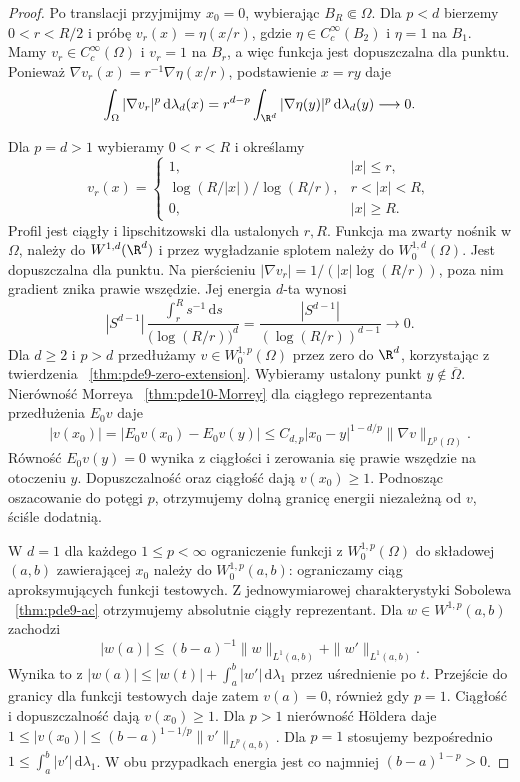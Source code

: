 \begin{proof}
Po translacji przyjmijmy $x_0=0$, wybierając
$B_R\Subset\Omega$. Dla $p<d$ bierzemy
$0<r<R/2$ i próbę $v_r(x)=\eta(x/r)$, gdzie
$\eta\in C_c^\infty(B_2)$ i $\eta=1$ na $B_1$.
Mamy $v_r\in C_c^\infty(\Omega)$ i $v_r=1$ na $B_r$,
a więc funkcja jest dopuszczalna dla punktu.
Ponieważ $\nabla v_r(x)=r^{-1}\nabla\eta(x/r)$,
podstawienie $x=ry$ daje
\[
 \int_\Omega|\nabla v_r|^p\,\mathrm d\lambda_d(x)
 =r^{d-p}\int_{\R^d}|\nabla\eta(y)|^p\,\mathrm d\lambda_d(y)
 \longrightarrow0.
\]

Dla $p=d>1$ wybieramy $0<r<R$ i określamy
\[
 v_r(x)=
 \begin{cases}
 1,& |x|\le r,\\
 \log(R/|x|)/\log(R/r),&r<|x|<R,\\
 0,&|x|\ge R.
 \end{cases}
\]
Profil jest ciągły i lipschitzowski dla ustalonych $r,R$.
Funkcja ma zwarty nośnik w $\Omega$, należy do
$W^{1,d}(\R^d)$ i przez wygładzanie splotem należy
do $W_0^{1,d}(\Omega)$. Jest dopuszczalna dla punktu.
Na pierścieniu $|\nabla v_r|=1/(|x|\log(R/r))$,
poza nim gradient znika prawie wszędzie.
Jej energia $d$-ta wynosi
\[
 |S^{d-1}|\,\frac{\displaystyle\int_r^R s^{-1}\,\mathrm ds}
 {\bigl(\log(R/r)\bigr)^d}
 =\frac{|S^{d-1}|}{(\log(R/r))^{d-1}}\longrightarrow0.
\]
Dla $d\ge2$ i $p>d$ przedłużamy $v\in W_0^{1,p}(\Omega)$
przez zero do $\R^d$, korzystając z twierdzenia
~\ref{thm:pde9-zero-extension}. Wybieramy ustalony
punkt $y\notin\overline\Omega$. Nierówność Morreya
~\ref{thm:pde10-Morrey} dla ciągłego reprezentanta
przedłużenia $E_0v$ daje
\[
 |v(x_0)|=|E_0v(x_0)-E_0v(y)|
 \le C_{d,p}|x_0-y|^{1-d/p}\|\nabla v\|_{L^p(\Omega)}.
\]
Równość $E_0v(y)=0$ wynika z ciągłości i zerowania się
prawie wszędzie na otoczeniu $y$.
Dopuszczalność oraz ciągłość dają $v(x_0)\ge1$.
Podnosząc oszacowanie do potęgi $p$, otrzymujemy
dolną granicę energii niezależną od $v$, ściśle dodatnią.

W $d=1$ dla każdego $1\le p<\infty$ ograniczenie
funkcji z $W_0^{1,p}(\Omega)$ do składowej $(a,b)$
zawierającej $x_0$ należy do $W_0^{1,p}(a,b)$:
ograniczamy ciąg aproksymujących funkcji testowych.
Z jednowymiarowej charakterystyki Sobolewa
~\ref{thm:pde9-ac} otrzymujemy absolutnie ciągły
reprezentant. Dla $w\in W^{1,p}(a,b)$ zachodzi
\[
 |w(a)|\le (b-a)^{-1}\|w\|_{L^1(a,b)}
 +\|w'\|_{L^1(a,b)}.
\]
Wynika to z $|w(a)|\le |w(t)|+\int_a^b|w'|
\,\mathrm d\lambda_1$ przez uśrednienie po $t$.
Przejście do granicy dla funkcji testowych
daje zatem $v(a)=0$, również gdy $p=1$.
Ciągłość i dopuszczalność dają $v(x_0)\ge1$.
Dla $p>1$ nierówność
Höldera daje
$1\le |v(x_0)|\le (b-a)^{1-1/p}\|v'\|_{L^p(a,b)}$.
Dla $p=1$ stosujemy bezpośrednio
$1\le\int_a^b|v'|\,\mathrm d\lambda_1$.
W obu przypadkach energia jest co najmniej
$(b-a)^{1-p}>0$.
\end{proof}

